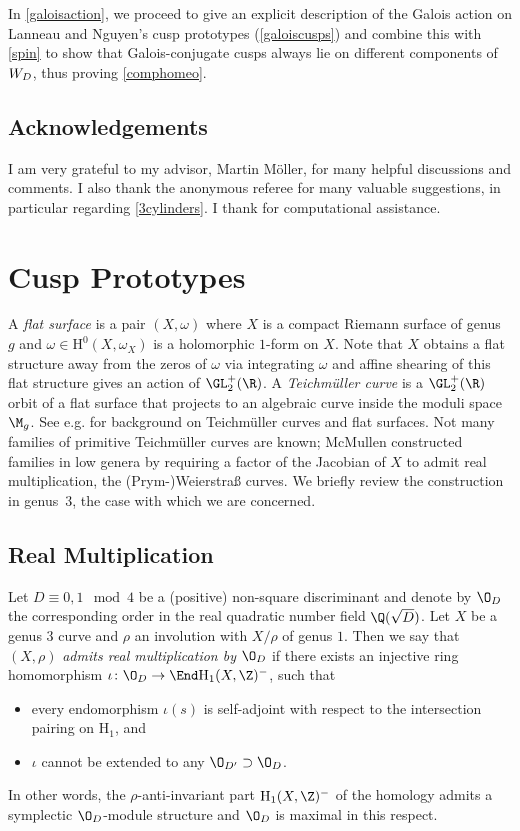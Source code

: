 \documentclass{amsart}
\makeatletter
\newcommand*{\@gobblenexttocentry}[9]{}
\newcommand*{\@gobblenexttocentry}[4]{}
\newcommand*{\addsubsection}{%
    \addtocontents{toc}{\protect\@gobblenexttocentry}%
    \subsection*}
\renewcommand{\H}%
{\mathrm{H}}
\makeatother
\begin{document}
In \autoref{galoisaction}, we proceed to give an explicit description of the Galois action on Lanneau and Nguyen's cusp prototypes (\autoref{galoiscusps}) and combine this with \autoref{spin} to show that Galois-conjugate cusps always lie on different components of $\W$, thus proving \autoref{comphomeo}.

\addsubsection{Acknowledgements}
I am very grateful to my advisor, Martin Möller, for many helpful discussions and comments. I also thank the anonymous referee for many valuable suggestions, in particular regarding \autoref{3cylinders}. I thank \cite{PARI2} for computational assistance.

\section{Cusp Prototypes}
\label{cusps}

A \emph{flat surface} is a pair $(X,\omega)$ where $X$ is a compact Riemann surface of genus~$g$ and $\omega\in\H^0(X,\omega_X)$ is a holomorphic $1$-form on $X$. Note that $X$ obtains a flat structure away from the zeros of $\omega$ via integrating $\omega$ and affine shearing of this flat structure gives an action of $\GL_2^+(\R)$.
A \emph{Teichmüller curve} is a $\GL_2^+(\R)$ orbit of a flat surface that projects to an algebraic curve inside the moduli space $\M_g$. See e.g. \cite{parkcity} for background on Teichmüller curves and flat surfaces. Not many families of primitive Teichmüller curves are known; McMullen constructed families in low genera by requiring a factor of the Jacobian of $X$ to admit real multiplication, the (Prym-)Weierstraß curves. We briefly review the construction in genus~$3$, the case with which we are concerned.


\addsubsection{Real Multiplication}
Let $D\equiv 0,1\mod 4$ be a (positive) non-square discriminant and denote by $\O_D$ the corresponding order in the real quadratic number field $\Q(\sqrt{D})$. Let $X$ be a genus $3$ curve and $\rho$ an involution with $X/\rho$ of genus $1$. Then we say that $(X,\rho)$ \emph{admits real multiplication by $\O_D$} if there exists an injective ring homomorphism $\iota\colon\O_D\rightarrow\End\H_1(X,\Z)^-$, such that
\begin{itemize}
\item every endomorphism $\iota(s)$ is self-adjoint with respect to the intersection pairing on $\H_1$, and
\item $\iota$ cannot be extended to any $\O_{D'}\supset\O_D$.
\end{itemize}
In other words, the $\rho$-anti-invariant part $\H_1(X,\Z)^-$ of the homology admits a symplectic $\O_D$-module structure and $\O_D$ is maximal in this respect.
\end{document}
